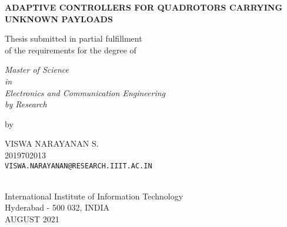 \thispagestyle{empty}
\begin{center}
\vspace*{1.5cm}
{\Large \bf ADAPTIVE CONTROLLERS FOR QUADROTORS CARRYING UNKNOWN PAYLOADS}

\vspace*{2.75cm}
{\large Thesis submitted in partial fulfillment\\}
{\large  of the requirements for the degree of \\}

\vspace*{1cm}
{\it {\large Master of Science} \\
{\large in\\}
{\large Electronics and Communication Engineering \\}
{\large by Research \\}}

\vspace*{1cm}
{\large by}

\vspace*{5mm}
{\large VISWA NARAYANAN S.\\}
{\large 2019702013\\
{\small \tt VISWA.NARAYANAN@RESEARCH.IIIT.AC.IN}}


\vspace*{4.0cm}
{\\}
{\large International Institute of Information Technology\\}
{\large Hyderabad - 500 032, INDIA\\}
{\large AUGUST 2021\\}
\end{center}